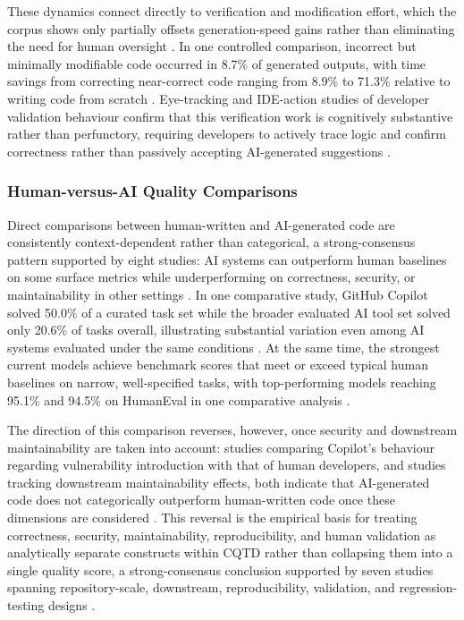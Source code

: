 These dynamics connect directly to verification and modification effort, which the corpus shows only partially offsets generation-speed gains rather than eliminating the need for human oversight \cite{idrisov_program_2024,tang_developer_2024,zhong_developer-llm_2025,siddiq_quality_2024,bose_prompts_2025,abbassi_recatcher_2025,tian_codehalu_2025}. In one controlled comparison, incorrect but minimally modifiable code occurred in 8.7\% of generated outputs, with time savings from correcting near-correct code ranging from 8.9\% to 71.3\% relative to writing code from scratch \cite{idrisov_program_2024}. Eye-tracking and IDE-action studies of developer validation behaviour confirm that this verification work is cognitively substantive rather than perfunctory, requiring developers to actively trace logic and confirm correctness rather than passively accepting AI-generated suggestions \cite{tang_developer_2024}.

\subsubsection{Human-versus-AI Quality Comparisons}
\label{sec:cqtd-human-vs-ai}
Direct comparisons between human-written and AI-generated code are consistently context-dependent rather than categorical, a strong-consensus pattern supported by eight studies: AI systems can outperform human baselines on some surface metrics while underperforming on correctness, security, or maintainability in other settings \cite{idrisov_program_2024,bayram_comparative_2025,cotroneo_devaic_2025,asare_is_2024,rabbi_ai_2024,siddiq_quality_2024,borg_echoes_2026,pearce_asleep_2025}. In one comparative study, GitHub Copilot solved 50.0\% of a curated task set while the broader evaluated AI tool set solved only 20.6\% of tasks overall, illustrating substantial variation even among AI systems evaluated under the same conditions \cite{idrisov_program_2024}. At the same time, the strongest current models achieve benchmark scores that meet or exceed typical human baselines on narrow, well-specified tasks, with top-performing models reaching 95.1\% and 94.5\% on HumanEval in one comparative analysis \cite{bayram_comparative_2025}.

The direction of this comparison reverses, however, once security and downstream maintainability are taken into account: studies comparing Copilot's behaviour regarding vulnerability introduction with that of human developers, and studies tracking downstream maintainability effects, both indicate that AI-generated code does not categorically outperform human-written code once these dimensions are considered \cite{asare_is_2024,borg_echoes_2026}. This reversal is the empirical basis for treating correctness, security, maintainability, reproducibility, and human validation as analytically separate constructs within CQTD rather than collapsing them into a single quality score, a strong-consensus conclusion supported by seven studies spanning repository-scale, downstream, reproducibility, validation, and regression-testing designs \cite{liu_debt_2026,schreiber_security_2026,borg_echoes_2026,vangala_ai-generated_2026,tang_developer_2024,siddiq_quality_2024,abbassi_recatcher_2025}.

